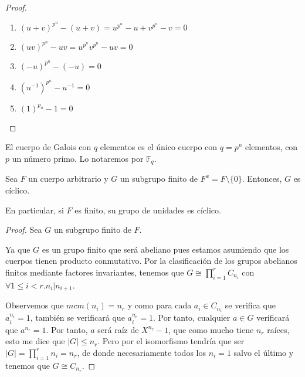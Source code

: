 \begin{proof}
\begin{enumerate}
\item $(u+v)^{p^n} - (u+v) = u^{p^n}-u+v^{p^n}-v = 0$
\item $(uv)^{p^n}-uv = u^{p^n}v^{p^n} - uv = 0$
\item $(-u)^{p^n} - (-u) = 0$
\item $(u^{-1})^{p^n} - u^{-1} = 0$
\item $(1)^{p_n} - 1 = 0$
\end{enumerate}
\end{proof}

\begin{definition}
El cuerpo de Galois con $q$ elementos es el único cuerpo con $q = p^n$ elementos, con $p$ un número primo. Lo notaremos por $\mathbb{F}_q$. 
\end{definition}

\begin{proposition}
	Sea $F$ un cuerpo arbitrario y $G$ un subgrupo finito de $F^x = F \setminus \{0\}$. Entonces, $G$ es cíclico.
	
	En particular, si $F$ es finito, su grupo de unidades es cíclico. 
\end{proposition}
\begin{proof}
	Sea $G$ un subgrupo finito de $F$. 
	
	Ya que $G$ es un grupo finito que será abeliano pues estamos asumiendo que los cuerpos tienen producto conmutativo. Por la clasificación de los grupos abelianos finitos mediante factores invariantes, tenemos que $G \cong \prod_{i = 1}^r C_{n_i}$ con $\forall 1 \le i < r. n_i|n_{i+1}$.
	
	Observemos que $mcm(n_i) = n_r$ y como para cada $a_i \in C_{n_i}$ se verifica que $a_i^{n_i} = 1$, también se verificará que $a_i^{n_r} = 1$. Por tanto, cualquier $a \in G$ verificará que $a^{n_r} = 1$. Por tanto, $a$ será raíz de $X^{n_r}-1$, que como mucho tiene $n_r$ raíces, esto me dice que $|G| \le n_r$. Pero por el isomorfismo tendría que ser $|G| = \prod_{i = 1}^r n_i = n_r$, de donde necesariamente todos los $n_i = 1$ salvo el último y tenemos que $G \cong C_{n_r}$. 
\end{proof}

